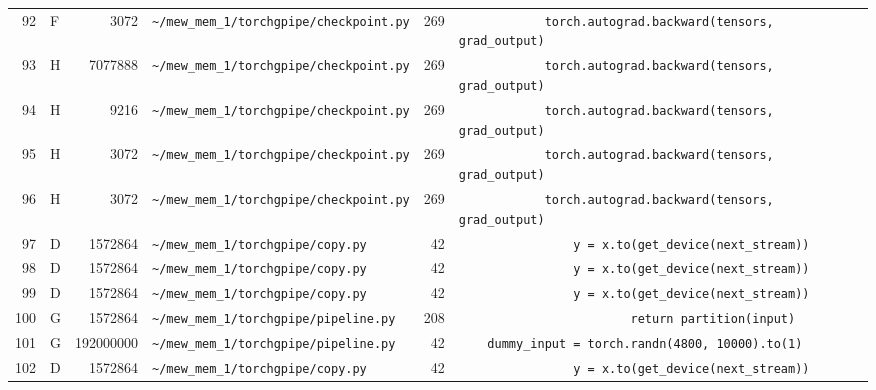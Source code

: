 \documentclass{article}
\begin{document}
\begin{longtable}{r l r p{6.5cm} r p{7.0cm}}
92 & F & 3072 & \lstinline|~/mew_mem_1/torchgpipe/checkpoint.py| & 269 & \lstinline|            torch.autograd.backward(tensors, grad_output)| \\
93 & H & 7077888 & \lstinline|~/mew_mem_1/torchgpipe/checkpoint.py| & 269 & \lstinline|            torch.autograd.backward(tensors, grad_output)| \\
94 & H & 9216 & \lstinline|~/mew_mem_1/torchgpipe/checkpoint.py| & 269 & \lstinline|            torch.autograd.backward(tensors, grad_output)| \\
95 & H & 3072 & \lstinline|~/mew_mem_1/torchgpipe/checkpoint.py| & 269 & \lstinline|            torch.autograd.backward(tensors, grad_output)| \\
96 & H & 3072 & \lstinline|~/mew_mem_1/torchgpipe/checkpoint.py| & 269 & \lstinline|            torch.autograd.backward(tensors, grad_output)| \\
97 & D & 1572864 & \lstinline|~/mew_mem_1/torchgpipe/copy.py| & 42 & \lstinline|                y = x.to(get_device(next_stream))| \\
98 & D & 1572864 & \lstinline|~/mew_mem_1/torchgpipe/copy.py| & 42 & \lstinline|                y = x.to(get_device(next_stream))| \\
99 & D & 1572864 & \lstinline|~/mew_mem_1/torchgpipe/copy.py| & 42 & \lstinline|                y = x.to(get_device(next_stream))| \\
100 & G & 1572864 & \lstinline|~/mew_mem_1/torchgpipe/pipeline.py| & 208 & \lstinline|                        return partition(input)| \\
101 & G & 192000000 & \lstinline|~/mew_mem_1/torchgpipe/pipeline.py| & 42 & \lstinline|    dummy_input = torch.randn(4800, 10000).to(1)| \\
102 & D & 1572864 & \lstinline|~/mew_mem_1/torchgpipe/copy.py| & 42 & \lstinline|                y = x.to(get_device(next_stream))| \\
\end{longtable}
\end{document}
